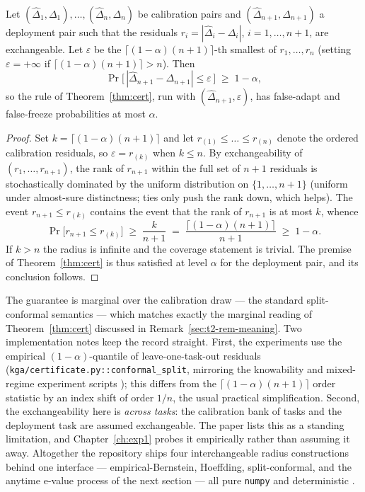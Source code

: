 \begin{proposition}
\label{sec:t2-prop-conformal}
Let $(\widehat\Delta_1,\Delta_1),\dots,(\widehat\Delta_n,\Delta_n)$ be calibration
pairs and $(\widehat\Delta_{n+1},\Delta_{n+1})$ a deployment pair such that the
residuals $r_i=|\widehat\Delta_i-\Delta_i|$, $i=1,\dots,n+1$, are exchangeable. Let
$\varepsilon$ be the $\lceil(1-\alpha)(n+1)\rceil$-th smallest of $r_1,\dots,r_n$
(setting $\varepsilon=+\infty$ if $\lceil(1-\alpha)(n+1)\rceil>n$). Then
\[
\Pr\bigl[\,|\widehat\Delta_{n+1}-\Delta_{n+1}|\le\varepsilon\,\bigr]\;\ge\;1-\alpha ,
\]
so the rule of Theorem~\ref{thm:cert}, run with $(\widehat\Delta_{n+1},\varepsilon)$,
has false-adapt and false-freeze probabilities at most $\alpha$.
\end{proposition}

\begin{proof}
Set $k=\lceil(1-\alpha)(n+1)\rceil$ and let $r_{(1)}\le\dots\le r_{(n)}$ denote the
ordered calibration residuals, so $\varepsilon=r_{(k)}$ when $k\le n$. By
exchangeability of $(r_1,\dots,r_{n+1})$, the rank of $r_{n+1}$ within the full set of
$n+1$ residuals is stochastically dominated by the uniform distribution on
$\{1,\dots,n+1\}$ (uniform under almost-sure distinctness; ties only push the rank
down, which helps). The event $r_{n+1}\le r_{(k)}$ contains the event that the rank of
$r_{n+1}$ is at most $k$, whence
\[
\Pr\bigl[r_{n+1}\le r_{(k)}\bigr]\;\ge\;\frac{k}{n+1}
\;=\;\frac{\lceil(1-\alpha)(n+1)\rceil}{n+1}\;\ge\;1-\alpha .
\]
If $k>n$ the radius is infinite and the coverage statement is trivial. The premise of
Theorem~\ref{thm:cert} is thus satisfied at level $\alpha$ for the deployment pair, and
its conclusion follows. \qedhere
\end{proof}

The guarantee is marginal over the calibration draw --- the standard split-conformal
semantics \cite{angelopoulos2023conformal} --- which matches exactly the marginal
reading of Theorem~\ref{thm:cert} discussed in Remark~\ref{sec:t2-rem-meaning}. Two
implementation notes keep the record straight. First, the experiments use the empirical
$(1-\alpha)$-quantile of leave-one-task-out residuals
(\texttt{kga/certificate.py::conformal\_split}, mirroring the knowability and
mixed-regime experiment scripts \cite{kbound2026repo}); this differs from the
$\lceil(1-\alpha)(n+1)\rceil$ order statistic by an index shift of order $1/n$, the
usual practical simplification. Second, the exchangeability here is \emph{across
tasks}: the calibration bank of tasks and the deployment task are assumed exchangeable.
The paper lists this as a standing limitation, and Chapter~\ref{ch:exp1} probes it
empirically rather than assuming it away. Altogether the repository ships four
interchangeable radius constructions behind one interface --- empirical-Bernstein,
Hoeffding, split-conformal, and the anytime e-value process of the next section ---
all pure \texttt{numpy} and deterministic \cite{kbound2026repo}.

